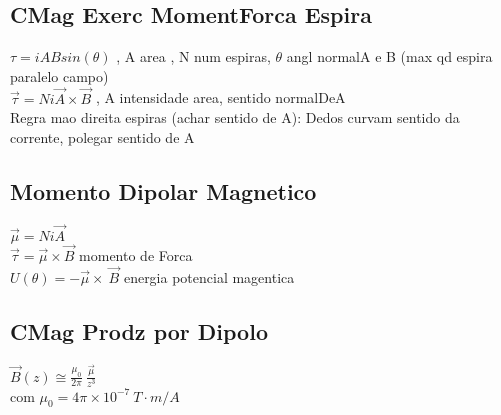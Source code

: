 \subsection{CMag Exerc MomentForca Espira}
$\tau =iABsin\left(\theta \right)$ , A area , N num espiras, $\theta$ angl normalA e B (max qd espira paralelo campo)\\
$\vec{\tau }=Ni\vec{A}\times \vec{B}$ , A intensidade area, sentido normalDeA\\
Regra mao direita espiras (achar sentido de A): Dedos curvam sentido da corrente, polegar sentido de A\\
\subsection{Momento Dipolar Magnetico}
$\vec{\mu }=Ni\vec{A}$\\
$\vec{\tau }=\vec{\mu }\times \vec{B}$ momento de Forca\\
$U\left(\theta \right)=-\vec{\mu }\times \:\vec{B}$ energia potencial magentica\\
\subsection{CMag Prodz por Dipolo}
$\vec{B}\left(z\right)\cong \frac{\mu _0}{2\pi }\:\frac{\vec{\mu }}{z^3}$\\
com $\mu _0=4\pi \times 10^{-7}\:T\cdot m/A$\\